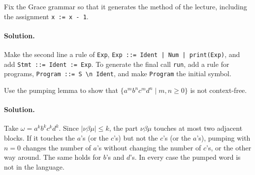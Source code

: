 \begin{exercise}
Fix the Grace grammar so that it generates the method of the lecture,
including the assignment \texttt{x := x - 1}.
\end{exercise}

\paragraph{Solution.} Make the second line a rule of \texttt{Exp},
\texttt{Exp ::= Ident | Num | print(Exp)}, and add
\texttt{Stmt ::= Ident := Exp}. To generate the final call \texttt{run}, add a
rule for programs, \texttt{Program ::= S \textbackslash n Ident}, and make
\texttt{Program} the initial symbol.

\begin{exercise}
Use the pumping lemma to show that $\{a^m b^n c^m d^n \mid m, n \ge 0\}$ is not
context-free.
\end{exercise}

\paragraph{Solution.} Take $\omega = a^k b^k c^k d^k$. Since $|\nu\beta\mu| \le k$, the
part $\nu\beta\mu$ touches at most two adjacent blocks. If it touches the $a$'s
(or the $c$'s) but not the $c$'s (or the $a$'s), pumping with $n = 0$ changes
the number of $a$'s without changing the number of $c$'s, or the other way
around. The same holds for $b$'s and $d$'s. In every case the pumped word is
not in the language.
